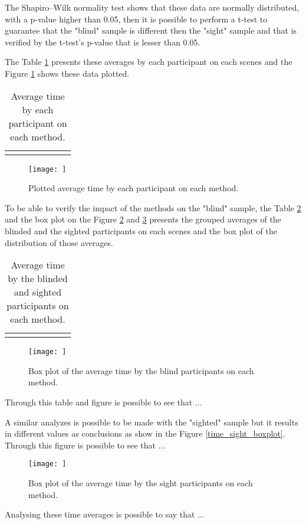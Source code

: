The Shapiro–Wilk normality test shows that these data are normally distributed, with a p-value higher than 0.05, then it is possible to perform a t-test to guarantee that the "blind" sample is different then the "sight" sample and that is verified by the t-test's p-value that is lesser than 0.05.

The Table \ref{tab:time_average} presents these averages by each participant on each scenes and the Figure \ref{fig:time_average} shows these data plotted.

\begin{table}[!htb]
\centering
\caption{Average time by each participant on each method.}
\label{tab:time_average}
\begin{tabular}{lrrrrrr}
{}
\end{tabular}
\end{table}

\begin{figure}[!htb]
    \centering
    \texttt{[image: ]}
    \caption{Plotted average time by each participant on each method.}
    \label{fig:time_average}
\end{figure}

To be able to verify the impact of the methods on the "blind" sample, the Table \ref{tab:time_average_group} and the box plot on the Figure \ref{fig:time_blind_boxplot} and \ref{fig:time_sight_boxplot} presents the grouped averages of the blinded and the sighted participants on each scenes and the box plot of the distribution of those averages. 

\begin{table}[!htb]
\centering
\caption{Average time by the blinded and sighted participants on each method.}
\label{tab:time_average_group}
\begin{tabular}{lrrrrrr}
{}
\end{tabular}
\end{table}

\begin{figure}[!htb]
    \centering
    \texttt{[image: ]}
    \caption{Box plot of the average time by the blind participants on each method.}
    \label{fig:time_blind_boxplot}
\end{figure}

Through this table and figure is possible to see that ...

A similar analyzes is possible to be made with the "sighted" sample but it results in different values as conclusions as show in the Figure \ref{time_sight_boxplot}. Through this figure is possible to see that ...

\begin{figure}[!htb]
    \centering
    \texttt{[image: ]}
    \caption{Box plot of the average time by the sight participants on each method.}
    \label{fig:time_sight_boxplot}
\end{figure}

Analysing these time averages is possible to say that ...